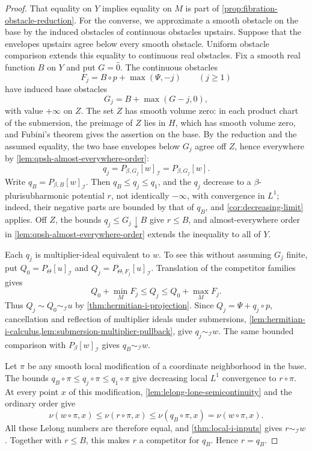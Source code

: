 \begin{proof}
That equality on $Y$ implies equality on $M$ is part of \cref{prop:fibration-obstacle-reduction}. For the converse, we approximate a smooth obstacle on the base by the induced obstacles of continuous obstacles upstairs. Suppose that the envelopes upstairs agree below every smooth obstacle. Uniform obstacle comparison extends this equality to continuous real obstacles. Fix a smooth real function $B$ on $Y$ and put $G=\widehat 0$. The continuous obstacles
\[
 F_j=B\circ p+\max(\Psi,-j)\qquad(j\geq1)
\]
have induced base obstacles
\[
 G_j=B+\max(G-j,0),
\]
with value $+\infty$ on $Z$. The set $Z$ has smooth volume zero: in each product chart of the submersion, the preimage of $Z$ lies in $H$, which has smooth volume zero, and Fubini's theorem gives the assertion on the base. By the reduction and the assumed equality, the two base envelopes below $G_j$ agree off $Z$, hence everywhere by \cref{lem:qpsh-almost-everywhere-order}:
\[
 q_j=P_{\beta,G_j}[w]_{\mathcal I}=P_{\beta,G_j}[w].
\]
Write $q_B=P_{\beta,B}[w]_{\mathcal I}$. Then $q_B\leq q_j\leq q_1$, and the $q_j$ decrease to a $\beta$-plurisubharmonic potential $r$, not identically $-\infty$, with convergence in $L^1$; indeed, their negative parts are bounded by that of $q_B$, and \cref{cor:decreasing-limit} applies. Off $Z$, the bounds $q_j\leq G_j\downarrow B$ give $r\leq B$, and almost-everywhere order in \cref{lem:qpsh-almost-everywhere-order} extends the inequality to all of $Y$.

Each $q_j$ is multiplier-ideal equivalent to $w$. To see this without assuming $G_j$ finite, put $Q_0=P_\Theta[u]_{\mathcal I}$ and $Q_j=P_{\Theta,F_j}[u]_{\mathcal I}$. Translation of the competitor families gives
\[
 Q_0+\min_MF_j\leq Q_j\leq Q_0+\max_MF_j.
\]
Thus $Q_j\sim Q_0\sim_{\mathcal I}u$ by \cref{thm:hermitian-i-projection}. Since $Q_j=\Psi+q_j\circ p$, cancellation and reflection of multiplier ideals under submersions, \cref{lem:hermitian-i-calculus,lem:submersion-multiplier-pullback}, give $q_j\sim_{\mathcal I}w$. The same bounded comparison with $P_\beta[w]_{\mathcal I}$ gives $q_B\sim_{\mathcal I}w$.

Let $\pi$ be any smooth local modification of a coordinate neighborhood in the base. The bounds $q_B\circ\pi\leq q_j\circ\pi\leq q_1\circ\pi$ give decreasing local $L^1$ convergence to $r\circ\pi$. At every point $x$ of this modification, \cref{lem:lelong-lone-semicontinuity} and the ordinary order give
\[
 \nu(w\circ\pi,x)
 \leq\nu(r\circ\pi,x)
 \leq\nu(q_B\circ\pi,x)=\nu(w\circ\pi,x).
\]
All these Lelong numbers are therefore equal, and \cref{thm:local-i-inputs} gives $r\sim_{\mathcal I}w$. Together with $r\leq B$, this makes $r$ a competitor for $q_B$. Hence $r=q_B$.


\end{proof}
